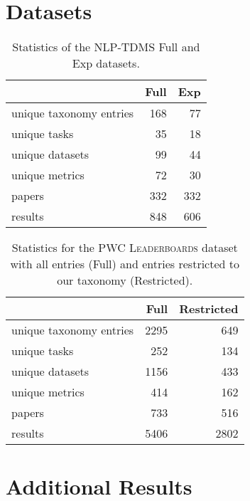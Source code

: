 \documentclass[11pt,a4paper]{article}
\newcommand{\leaderboards}{\textsc{PWC Leaderboards}}
\begin{document}
\section{Datasets}
\begin{table}[H]
    \centering
    \setlength{\tabcolsep}{4pt}
    \caption{Statistics of the NLP-TDMS Full and Exp datasets.}
    \label{tab:datasets:nlp-tdms}
    \begin{tabular}{lrr}
     \toprule
 & Full & Exp\\\midrule
     unique taxonomy entries & 168 & 77\\
     unique tasks & 35 & 18\\
     unique datasets & 99 & 44\\
     unique metrics & 72 & 30\\\midrule
 papers & 332 & 332\\
     results & 848 & 606\\
     \bottomrule
    \end{tabular}
\end{table}

\begin{table}[H]
    \centering
    \setlength{\tabcolsep}{8pt}
    \caption{Statistics for the \leaderboards{} dataset with all entries (Full) and entries restricted to our taxonomy (Restricted).}
    \label{tab:dataset:labeled}
    \begin{tabular}{lrr}
     \toprule
     & Full & Restricted\\\midrule
    unique taxonomy entries   &  2295 &   649\\
    unique tasks              &   252 &   134\\
    unique datasets           &  1156 &   433\\
    unique metrics            &   414 &   162\\\midrule
    papers                    &   733 &   516\\
    results                   &  5406 &  2802\\
     \bottomrule
    \end{tabular}
\end{table}


\section{Additional Results}
\end{document}
